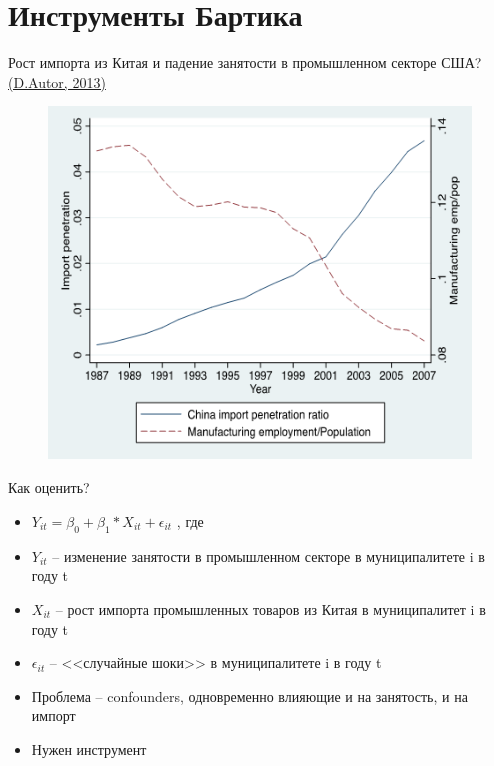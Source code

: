 \section{Инструменты Бартика}


\begin{frame}{Рост импорта из Китая и падение занятости в промышленном секторе США? \href {https://www.aeaweb.org/articles?id=10.1257/aer.103.6.2121}{(D.Autor, 2013)}}
  \begin{figure}
   \centering
    \includegraphics[width=\textwidth]{Lecture_Sources/Images/Bartik_import.png}
  \end{figure}
\end{frame}



\begin{frame}{Как оценить?}
  \begin{itemize}
      \item$Y_{it}=\beta_0+\beta_1*X_{it}+\epsilon_{it}$ , где
      \item $Y_{it}$ -- изменение занятости в промышленном секторе в муниципалитете i в году t
      \item $X_{it}$ -- рост импорта промышленных товаров из Китая в муниципалитет i в году t
      \item $\epsilon_{it}$ -- <<случайные шоки>> в муниципалитете i в году t
      \item Проблема -- confounders, одновременно влияющие и на занятость, и на импорт
      \item Нужен инструмент
  \end{itemize}
\end{frame}

